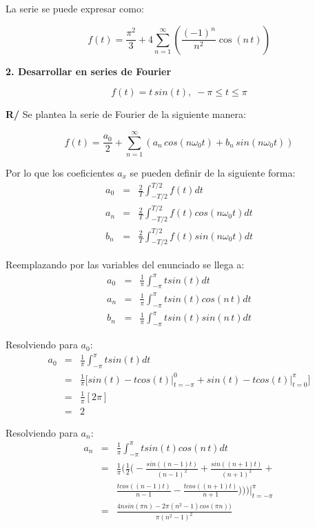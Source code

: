 \documentclass[twocolumn]{article}
\begin{document}
La serie se puede expresar como:

$$f(t) = \frac{\pi^2}{3} + 4 \sum_{n=1}^\infty\left(\frac{(-1)^n}{n^2}\cos{(n\,t)}\right)$$

\textbf{2. Desarrollar en series de Fourier}

$$f(t) = t \, sin(t),\; -\pi \leq t \leq \pi$$


\textbf{R/} Se plantea la serie de Fourier de la siguiente manera:

$$f(t) = \frac{a_0}{2} + \sum_{n=1}^\infty\left(a_n\,cos(n\omega_0t) + b_n\,sin(n\omega_0t)\right)$$

Por lo que los coeficientes $a_x$ se pueden definir de la siguiente forma:
\begin{eqnarray*}
a_0 &=& \frac{2}{T}\int_{-T/2}^{T/2}f(t)dt\\
a_n &=& \frac{2}{T}\int_{-T/2}^{T/2}f(t)cos(n\omega_0t)dt\\
b_n &=& \frac{2}{T}\int_{-T/2}^{T/2}f(t)sin(n\omega_0t)dt
\end{eqnarray*}

Reemplazando por las variables del enunciado se llega a:
\begin{eqnarray*}
a_0 &=& \frac{1}{\pi}\int_{-\pi}^{\pi}tsin(t)dt\\
a_n &=& \frac{1}{\pi}\int_{-\pi}^{\pi}tsin(t)cos(n\,t)dt\\
b_n &=& \frac{1}{\pi}\int_{-\pi}^{\pi}tsin(t)sin(n\,t)dt
\end{eqnarray*}

Resolviendo para $a_0$:
\begin{eqnarray*}
a_0 &=& \frac{1}{\pi}\int_{-\pi}^{\pi}tsin(t)dt\\
&=& \frac{1}{\pi} \bigg[ sin(t) -tcos(t)\bigg|_{t=-\pi}^{0} + sin(t) -tcos(t)\bigg|_{t=0}^{\pi} \bigg] \\
&=& \frac{1}{\pi} [2\pi]\\
&=& 2
\end{eqnarray*}

Resolviendo para $a_n$:
\begin{eqnarray*}
a_n &=& \frac{1}{\pi}\int_{-\pi}^{\pi}tsin(t)cos(n\,t)dt\\
&=& \frac{1}{\pi} \bigg(\frac{1}{2}\bigg(-\frac{sin((n-1)t)}{(n-1)^{2}} + \frac{sin((n+1)t)}{(n+1)^{2}}+ \\
& & \frac{tcos((n-1)t)}{n-1} - \frac{tcos((n+1)t)}{n+1})\bigg)\bigg)\bigg|_{t=-\pi}^{\pi}\\
&=& \frac{4nsin(\pi n)-2\pi(n^{2}-1)cos(\pi n))}{\pi(n^{2}- 1)^{2}}\\
\end{eqnarray*}
\end{document}
